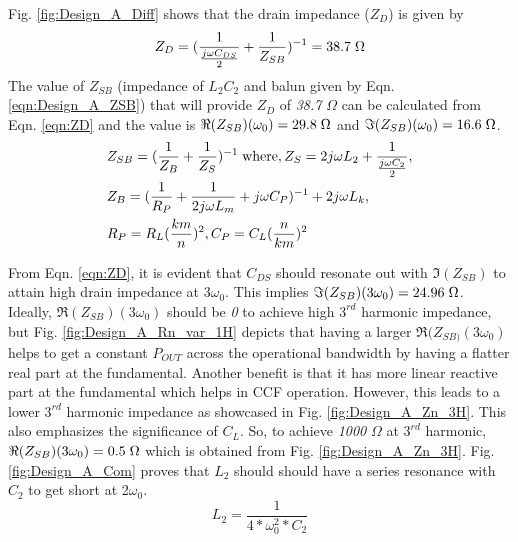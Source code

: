 \documentclass[conference]{IEEEtran}
\begin{document}
Fig. \ref{fig:Design_A_Diff} shows that the drain impedance ($Z_D$) is given by
\vspace{-0.05in}
\begin{equation}
    Z_D=(\frac{1}{\frac{j\omega C_{DS}}{2}}+\frac{1}{Z_{SB}})^{-1}=38.7 \hspace{1mm} \Omega
    \label{eqn:ZD}
\end{equation}
The value of $Z_{SB}$ (impedance of $L_2C_2$ and balun given by Eqn. \ref{eqn:Design_A_ZSB}) that will provide $Z_D$ of \textit{38.7} $\Omega$ can be calculated from Eqn. \ref{eqn:ZD} and the value is $\Re(Z_{SB})(\omega_0) =  29.8\hspace{1mm} \Omega$ and $\Im(Z_{SB})(\omega_0) = 16.6\hspace{1mm}\Omega$.
\vspace{-0.05in}
\begin{equation}
\begin{aligned}
    &Z_{SB}=(\frac{1}{Z_B}+\frac{1}{Z_S})^{-1}
    \hspace{1mm}\text{where}, Z_S=2j\omega  L_2+\frac{1}{\frac{j \omega C_2}{2}}, \\
    &Z_B=(\frac{1}{R_P}+\frac{1}{2j \omega  L_m}+j \omega C_P)^{-1}+2j \omega  L_k,\\ &R_P=R_L(\frac{km}{n})^2,C_P=C_L(\frac{n}{km})^2
\label{eqn:Design_A_ZSB}
\end{aligned}
\end{equation}

From Eqn. \ref{eqn:ZD}, it is evident that $C_{DS}$ should resonate out with $\Im(Z_{SB})$  to attain high drain impedance at $3\omega_0$. This implies $\Im(Z_{SB})(3\omega_0) = 24.96\hspace{1mm}\Omega$.
Ideally, $\Re(Z_{SB})(3\omega_0)$ should be \textit{0} to achieve high $3^{rd}$ harmonic impedance, but Fig. \ref{fig:Design_A_Rn_var_1H} depicts that having a larger $\Re(Z_{SB)}(3\omega_0)$ helps to get a constant $P_{OUT}$ across the operational bandwidth by having a flatter real part at the fundamental. Another benefit is that it has more linear reactive part at the fundamental which helps in CCF operation.
However, this leads to a lower $3^{rd}$ harmonic impedance as showcased in Fig. \ref{fig:Design_A_Zn_3H}. This also emphasizes  the significance of $C_L$. So, to achieve \textit{1000} $\Omega$ at $3^{rd}$ harmonic,  $\Re(Z_{SB})(3\omega_0) = 0.5\hspace{1mm}\Omega$ which is obtained from Fig. \ref{fig:Design_A_Zn_3H}. Fig. \ref{fig:Design_A_Com} proves that $L_2$ should  should have a series resonance with $C_2$ to get short at 2$\omega_0$.
\vspace{-0.05in}
\begin{equation}
    L_2=\frac{1}{4*\omega_0^2*C_2}%
    \label{eqn:Design_A_2H}
\end{equation}
\end{document}

